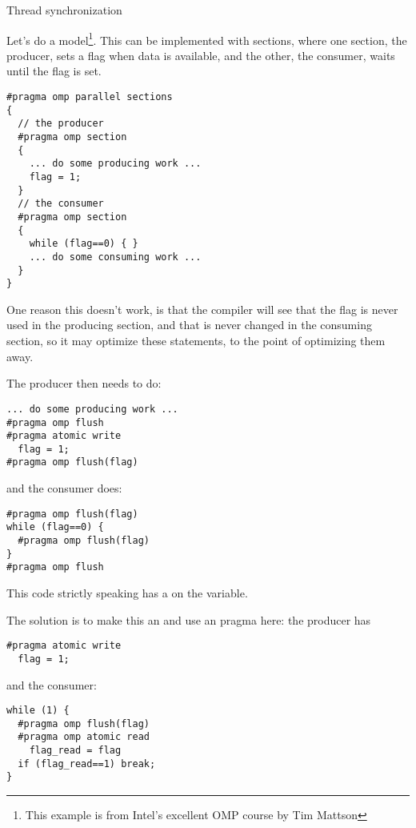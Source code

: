
 {Thread synchronization}

Let's do a  model\footnote{This example
  is from Intel's excellent OMP course by Tim Mattson}.  This can be
implemented with sections, where one section, the producer, sets a
flag when data is available, and the other, the consumer, waits until
the flag is set.
\begin{lstlisting}
#pragma omp parallel sections
{
  // the producer
  #pragma omp section
  {
    ... do some producing work ...
    flag = 1;
  }
  // the consumer
  #pragma omp section
  {
    while (flag==0) { }
    ... do some consuming work ...
  }
}
\end{lstlisting}
One reason this doesn't work, is that the compiler will see that the flag is never used
in the producing section, and that is never changed in the consuming section, so
it may optimize these statements, to the point of optimizing them away.

The producer then needs to do:
\begin{lstlisting}
... do some producing work ...
#pragma omp flush
#pragma atomic write
  flag = 1;
#pragma omp flush(flag)
\end{lstlisting}
and the consumer does:
\begin{lstlisting}
#pragma omp flush(flag)
while (flag==0) {
  #pragma omp flush(flag)
}
#pragma omp flush
\end{lstlisting}
This code strictly speaking has a  on the  variable.

The solution is to make this an  and
use an  pragma here: the producer has
\begin{lstlisting}
#pragma atomic write
  flag = 1;
\end{lstlisting}
and the consumer:
\begin{lstlisting}
while (1) {
  #pragma omp flush(flag)
  #pragma omp atomic read
    flag_read = flag
  if (flag_read==1) break;
}
\end{lstlisting}

